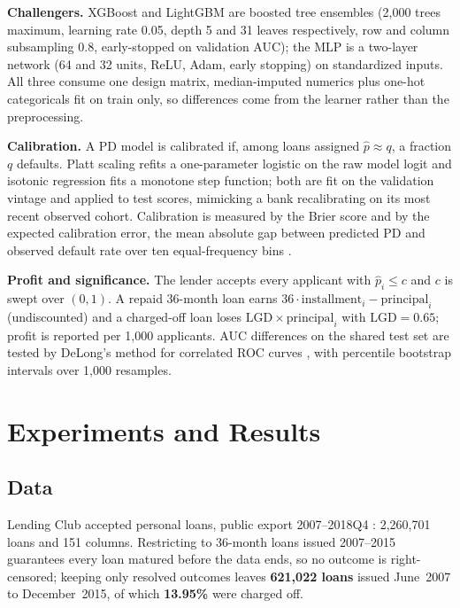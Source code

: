 \documentclass[a4paper,twocolumn,10pt]{article}
\begin{document}
\textbf{Challengers.} XGBoost \cite{chen2016} and LightGBM \cite{ke2017} are boosted tree ensembles (2{,}000 trees maximum, learning rate 0.05, depth 5 and 31 leaves respectively, row and column subsampling 0.8, early-stopped on validation AUC); the MLP is a two-layer network (64 and 32 units, ReLU, Adam, early stopping) on standardized inputs. All three consume one design matrix, median-imputed numerics plus one-hot categoricals fit on train only, so differences come from the learner rather than the preprocessing.

\textbf{Calibration.} A PD model is calibrated if, among loans assigned $\hat p\approx q$, a fraction $q$ defaults. Platt scaling \cite{platt1999} refits a one-parameter logistic on the raw model logit and isotonic regression \cite{zadrozny2002} fits a monotone step function; both are fit on the validation vintage and applied to test scores, mimicking a bank recalibrating on its most recent observed cohort. Calibration is measured by the Brier score and by the expected calibration error, the mean absolute gap between predicted PD and observed default rate over ten equal-frequency bins \cite{guo2017}.

\textbf{Profit and significance.} The lender accepts every applicant with $\hat p_i\le c$ and $c$ is swept over $(0,1)$. A repaid 36-month loan earns $36\cdot\text{installment}_i-\text{principal}_i$ (undiscounted) and a charged-off loan loses $\mathrm{LGD}\times\text{principal}_i$ with $\mathrm{LGD}=0.65$; profit is reported per 1{,}000 applicants. AUC differences on the shared test set are tested by DeLong's method for correlated ROC curves \cite{delong1988, sun2014}, with percentile bootstrap intervals over 1{,}000 resamples.

\section{Experiments and Results}

\subsection{Data}

Lending Club accepted personal loans, public export 2007--2018Q4 \cite{lendingclubdata}: 2{,}260{,}701 loans and 151 columns. Restricting to 36-month loans issued 2007--2015 guarantees every loan matured before the data ends, so no outcome is right-censored; keeping only resolved outcomes leaves \textbf{621{,}022 loans} issued June~2007 to December~2015, of which \textbf{13.95\%} were charged off.
\end{document}
